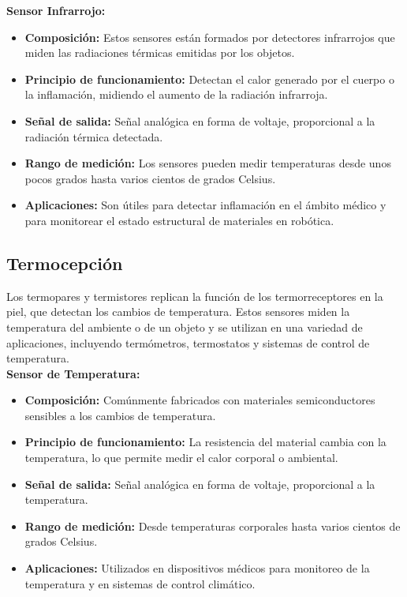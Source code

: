 \documentclass[conference]{IEEEtran}
\begin{document}
\textbf{Sensor Infrarrojo:}
\begin{itemize}
    \item \textbf{Composición:} Estos sensores están formados por detectores infrarrojos que miden las radiaciones térmicas emitidas por los objetos.
    \item \textbf{Principio de funcionamiento:} Detectan el calor generado por el cuerpo o la inflamación, midiendo el aumento de la radiación infrarroja.
    \item \textbf{Señal de salida:} Señal analógica en forma de voltaje, proporcional a la radiación térmica detectada.
    \item \textbf{Rango de medición:} Los sensores pueden medir temperaturas desde unos pocos grados hasta varios cientos de grados Celsius.
    \item \textbf{Aplicaciones:} Son útiles para detectar inflamación en el ámbito médico y para monitorear el estado estructural de materiales en robótica.
\end{itemize}

\subsection{Termocepción}

Los termopares y termistores replican la función de los termorreceptores en la piel, que detectan los cambios de temperatura. Estos sensores miden la temperatura del ambiente o de un objeto y se utilizan en una variedad de aplicaciones, incluyendo termómetros, termostatos y sistemas de control de temperatura.\\

\textbf{Sensor de Temperatura:}
\begin{itemize}
    \item \textbf{Composición:} Comúnmente fabricados con materiales semiconductores sensibles a los cambios de temperatura.
    \item \textbf{Principio de funcionamiento:} La resistencia del material cambia con la temperatura, lo que permite medir el calor corporal o ambiental.
    \item \textbf{Señal de salida:} Señal analógica en forma de voltaje, proporcional a la temperatura.
    \item \textbf{Rango de medición:} Desde temperaturas corporales hasta varios cientos de grados Celsius.
    \item \textbf{Aplicaciones:} Utilizados en dispositivos médicos para monitoreo de la temperatura y en sistemas de control climático.
\end{itemize}
\end{document}
